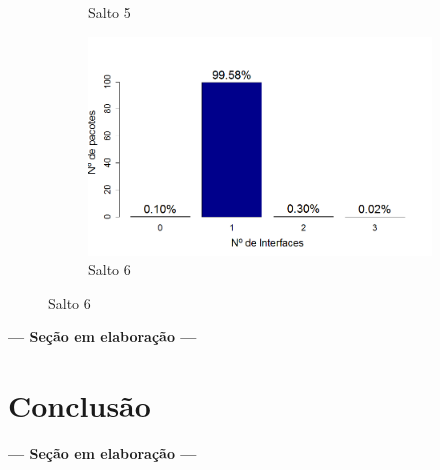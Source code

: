 \documentclass[
	12pt,				%
	openright,			%
	oneside,
	a4paper,			%
	english,			%
	french,				%
	spanish,			%
	brazil				%
	]{abntex2}
\begin{document}
\begin{figure}[htb]
\begin{subfigure}{.5\textwidth}
		\captionsetup{width=.9\textwidth}
		\caption{Salto 5}
		\label{dpr_opt_s5}
	\end{subfigure}%
	\begin{subfigure}{.5\textwidth}
		\centering
		\includegraphics[width=.98\linewidth]{DRP_OPT_Salto6}
		\captionsetup{width=.9\textwidth}
		\caption{Salto 6}
		\label{dpr_opt_s6}
	\end{subfigure}
\end{figure}

\begin{center}
	\textbf{--- Seção em elaboração ---}
\end{center}


\chapter{Conclusão} \label{chap_concl}

\begin{center}
	\textbf{--- Seção em elaboração ---}
\end{center}

\postextual


\end{document}
